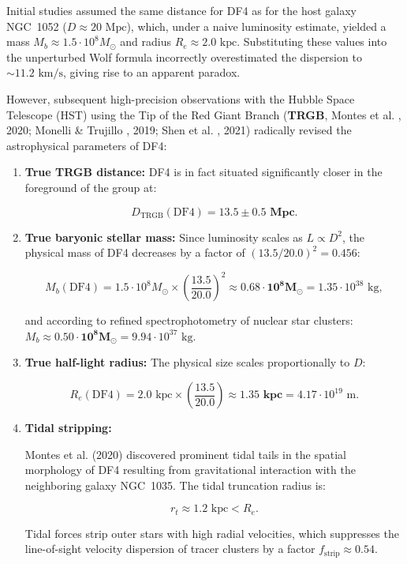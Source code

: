 \documentclass[11pt,a4paper]{article}
\theoremstyle{definition}
\begin{document}
Initial studies assumed the same distance for DF4 as for the host galaxy NGC~1052 ($D \approx 20\text{ Mpc}$), which, under a naive luminosity estimate, yielded a mass $M_b \approx 1.5 \cdot 10^8 M_\odot$ and radius $R_e \approx 2.0\text{ kpc}$. Substituting these values into the unperturbed Wolf formula incorrectly overestimated the dispersion to $\sim 11.2\text{ km/s}$, giving rise to an apparent paradox.

However, subsequent high-precision observations with the Hubble Space Telescope (HST) using the Tip of the Red Giant Branch (\textbf{TRGB}, Montes et al. \cite{ref30}, 2020; Monelli \& Trujillo \cite{ref31}, 2019; Shen et al. \cite{ref32}, 2021) radically revised the astrophysical parameters of DF4:

\begin{enumerate}
\item \textbf{True TRGB distance:} DF4 is in fact situated significantly closer in the foreground of the group at:

\begin{equation*}
D_{\text{TRGB}}(\text{DF4}) = \mathbf{13.5 \pm 0.5\text{ Mpc}}.
\end{equation*}

\item \textbf{True baryonic stellar mass:} Since luminosity scales as $L \propto D^2$, the physical mass of DF4 decreases by a factor of $(13.5 / 20.0)^2 = 0.456$:

\begin{equation*}
M_b(\text{DF4}) = 1.5 \cdot 10^8 M_\odot \times \left( \frac{13.5}{20.0} \right)^2 \approx \mathbf{0.68 \cdot 10^8 M_\odot} = 1.35 \cdot 10^{38}\text{ kg},
\end{equation*}

and according to refined spectrophotometry of nuclear star clusters: $M_b \approx \mathbf{0.50 \cdot 10^8 M_\odot} = 9.94 \cdot 10^{37}\text{ kg}$.

\item \textbf{True half-light radius:} The physical size scales proportionally to $D$:

\begin{equation*}
R_e(\text{DF4}) = 2.0\text{ kpc} \times \left( \frac{13.5}{20.0} \right) \approx \mathbf{1.35\text{ kpc}} = 4.17 \cdot 10^{19}\text{ m}.
\end{equation*}

\item \textbf{Tidal stripping:}  

Montes et al. \cite{ref30} (2020) discovered prominent tidal tails in the spatial morphology of DF4 resulting from gravitational interaction with the neighboring galaxy NGC~1035. The tidal truncation radius is:

\begin{equation*}
r_t \approx 1.2\text{ kpc} < R_e.
\end{equation*}

Tidal forces strip outer stars with high radial velocities, which suppresses the line-of-sight velocity dispersion of tracer clusters by a factor $f_{\text{strip}} \approx 0.54$.
\end{enumerate}
\end{document}
